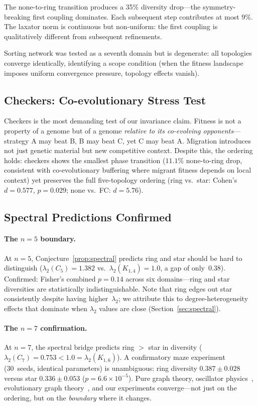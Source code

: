 \documentclass[submission,copyright,creativecommons]{eptcs}
\begin{document}
The none-to-ring transition produces a 35\% diversity drop---the
symmetry-breaking first coupling dominates. Each subsequent step
contributes at most 9\%. The laxator norm is continuous but
non-uniform: the first coupling is qualitatively different from
subsequent refinements.

Sorting network was tested as a seventh domain but is degenerate:
all topologies converge identically, identifying a scope condition
(when the fitness landscape imposes uniform convergence pressure,
topology effects vanish).

\subsection{Checkers: Co-evolutionary Stress Test}

Checkers is the most demanding test of our invariance claim.
Fitness is not a property of a genome but of a genome \emph{relative
to its co-evolving opponents}---strategy A may beat B, B may beat C,
yet C may beat A. Migration introduces not just genetic material but
new competitive context. Despite this, the ordering holds:
checkers shows the smallest phase transition ($11.1\%$
none-to-ring drop, consistent with co-evolutionary buffering where
migrant fitness depends on local context) yet preserves the full
five-topology ordering (ring vs.\ star: Cohen's $d = 0.577$,
$p = 0.029$; none vs.\ FC: $d = 5.76$).

\subsection{Spectral Predictions Confirmed}
\label{sec:spectral-confirm}

\paragraph{The $n{=}5$ boundary.}
At $n{=}5$, Conjecture~\ref{prop:spectral} predicts ring and star
should be hard to distinguish ($\lambda_2(C_5) = 1.382$ vs.\
$\lambda_2(K_{1,4}) = 1.0$, a gap of only~$0.38$). Confirmed:
Fisher's combined $p = 0.14$ across six domains---ring and star
diversities are statistically indistinguishable.
Note that ring edges out star consistently despite having
higher~$\lambda_2$; we attribute this to degree-heterogeneity
effects that dominate when $\lambda_2$ values are close
(Section~\ref{sec:spectral}).

\paragraph{The $n{=}7$ confirmation.}
At $n{=}7$, the spectral bridge predicts ring $>$ star in diversity
($\lambda_2(C_7) = 0.753 < 1.0 = \lambda_2(K_{1,6})$). A
confirmatory maze experiment (30~seeds, identical parameters) is
unambiguous: ring diversity $0.387 \pm 0.028$ versus star
$0.336 \pm 0.053$ ($p = 6.6 \times 10^{-5}$). Pure graph theory,
oscillator physics~\cite{sanz2026algebraic}, evolutionary graph
theory~\cite{brewster2025diversity}, and our experiments
converge---not just on the ordering, but on the \emph{boundary}
where it changes.
\end{document}
